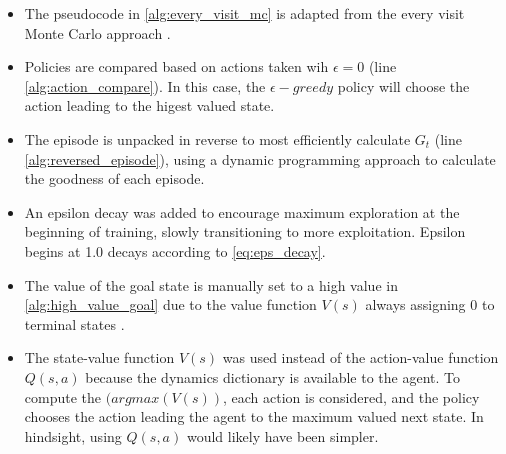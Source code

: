 \documentclass[letterpaper]{article} %
\begin{document}
	\begin{itemize}
	    \item The pseudocode in \ref{alg:every_visit_mc} is adapted from the every visit Monte Carlo approach \cite{SuttonBartoRLBook}.
	    \item Policies are compared based on actions taken wih $\epsilon=0$ (line \ref{alg:action_compare}). In this case, the $\epsilon-greedy$ policy will choose the action leading to the higest valued state.
	    \item The episode is unpacked in reverse to most efficiently calculate $G_t$ (line \ref{alg:reversed_episode}), using a dynamic programming approach to calculate the goodness of each episode.
	    \item An epsilon decay was added to encourage maximum exploration at the beginning of training, slowly transitioning to more exploitation. Epsilon begins at 1.0 decays according to \ref{eq:eps_decay}.
	    \item The value of the goal state is manually set to a high value in \ref{alg:high_value_goal} due to the value function $V(s)$ always assigning 0 to terminal states \cite{Morales2020GrokkingDL}.
	    \item The state-value function $V(s)$ was used instead of the action-value function $Q(s,a)$ because the dynamics dictionary is available to the agent. To compute the $(argmax(V(s))$, each action is considered, and the policy chooses the action leading the agent to the maximum valued next state. In hindsight, using $Q(s,a)$ would likely have been simpler.
	\end{itemize}
\end{document}

